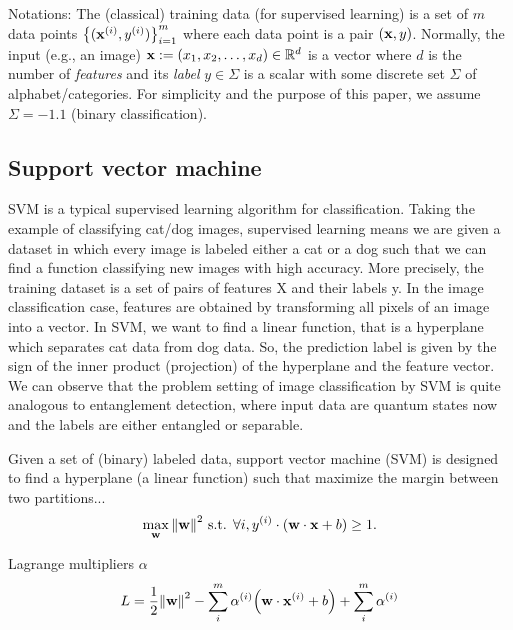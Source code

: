 Notations:
The (classical) training data (for supervised learning) is a set of $m$ data points $\qty{(\vb{x}^{(i)}, y^{(i)})}^{m}_{i=1}$ 
where each data point is a pair $(\vb{x},y)$.
Normally, the input (e.g., an image) $\vb{x}:= (x_1,x_2,\dots,x_d) \in \mathbb{R}^d$  is a vector where $d$ is the number of \emph{features}
and its \emph{label} $y\in\Sigma$ is a scalar with some discrete set $\Sigma$ of alphabet/categories. 
For simplicity and the purpose of this paper, we assume $\Sigma=\qty{-1,1}$ (binary classification).


\subsection{Support vector machine}\label{sec:svm}
SVM is a typical supervised learning algorithm for classification. Taking the example of classifying cat/dog images, supervised learning means we are given a dataset in which every image is labeled either a cat or a dog such that we can find a function classifying new images with high accuracy. More precisely,  the training dataset is a set of pairs of features X and their labels y. In the image classification case, features are obtained by transforming all pixels of an image into a vector. In SVM, we want to find a linear function, that is a hyperplane which separates cat data from dog data. So, the prediction label is given by the sign of the inner product (projection) of the hyperplane and the feature vector. We can observe that the problem setting of image classification by SVM is quite analogous to entanglement detection, where input data are quantum states now and the labels are either entangled or separable.


\begin{definition}[SVM]\label{def:svm}
	Given a set of (binary) labeled data,
	support vector machine (SVM) is designed to
	find a hyperplane (a linear function) such that maximize the margin between two partitions...
	\begin{equation}
		\max_{\vb{w}}
		\norm{\vb{w}}^2
		\text{ s.t. }
		\forall i , y^{(i)}\cdot (\vb{w}\cdot\vb{x}+b)\ge 1.
	\end{equation}
\end{definition}
Lagrange multipliers $\alpha$
\begin{equation}
	L = \frac{1}{2}\norm{\vb{w}}^2 - \sum_i^m \alpha^{(i)} \qty(\vb{w}\cdot \vb{x}^{(i)} + b) + \sum_i^m \alpha^{(i)}
\end{equation}

